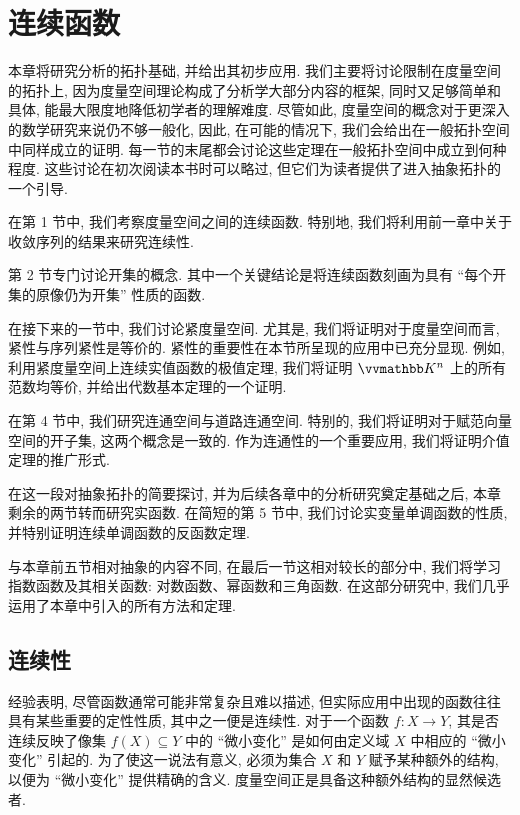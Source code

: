 \chapter{连续函数}

本章将研究分析的拓扑基础, 并给出其初步应用. 我们主要将讨论限制在度量空间的拓扑上, 因为度量空间理论构成了分析学大部分内容的框架, 同时又足够简单和具体, 能最大限度地降低初学者的理解难度. 尽管如此, 度量空间的概念对于更深入的数学研究来说仍不够一般化, 因此, 在可能的情况下, 我们会给出在一般拓扑空间中同样成立的证明. 每一节的末尾都会讨论这些定理在一般拓扑空间中成立到何种程度. 这些讨论在初次阅读本书时可以略过, 但它们为读者提供了进入抽象拓扑的一个引导.

在第 1 节中, 我们考察度量空间之间的连续函数. 特别地, 我们将利用前一章中关于收敛序列的结果来研究连续性.

第 2 节专门讨论开集的概念. 其中一个关键结论是将连续函数刻画为具有 ``每个开集的原像仍为开集'' 性质的函数.

在接下来的一节中, 我们讨论紧度量空间. 尤其是, 我们将证明对于度量空间而言, 紧性与序列紧性是等价的. 紧性的重要性在本节所呈现的应用中已充分显现. 例如, 利用紧度量空间上连续实值函数的极值定理, 我们将证明 \(\K^n\) 上的所有范数均等价, 并给出代数基本定理的一个证明.

在第 4 节中, 我们研究连通空间与道路连通空间. 特别的, 我们将证明对于赋范向量空间的开子集, 这两个概念是一致的. 作为连通性的一个重要应用, 我们将证明介值定理的推广形式.

在这一段对抽象拓扑的简要探讨, 并为后续各章中的分析研究奠定基础之后, 本章剩余的两节转而研究实函数. 在简短的第 5 节中, 我们讨论实变量单调函数的性质, 并特别证明连续单调函数的反函数定理.

与本章前五节相对抽象的内容不同, 在最后一节这相对较长的部分中, 我们将学习指数函数及其相关函数: 对数函数、幂函数和三角函数. 在这部分研究中, 我们几乎运用了本章中引入的所有方法和定理.

\newpage

\section{连续性}

经验表明, 尽管函数通常可能非常复杂且难以描述, 但实际应用中出现的函数往往具有某些重要的定性性质, 其中之一便是连续性. 对于一个函数 \(f \colon X \to Y\), 其是否连续反映了像集 \(f(X) \subseteq Y\) 中的 ``微小变化'' 是如何由定义域 \(X\) 中相应的 ``微小变化'' 引起的. 为了使这一说法有意义, 必须为集合 \(X\) 和 \(Y\) 赋予某种额外的结构, 以便为 ``微小变化'' 提供精确的含义. 度量空间正是具备这种额外结构的显然候选者.

